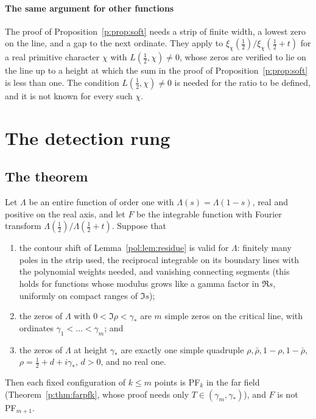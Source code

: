 \paragraph{The same argument for other functions} The proof of Proposition~\ref{p:prop:soft} needs a strip of finite width, a lowest zero on the line, and a gap to the next ordinate. They apply to $\xi_\chi(\frac12)/\xi_\chi(\frac12+t)$ for a real primitive character $\chi$ with $L(\frac12,\chi)\ne0$, whose zeros are verified to lie on the line up to a height at which the sum in the proof of Proposition~\ref{p:prop:soft} is less than one. The condition $L(\frac12,\chi)\ne0$ is needed for the ratio to be defined, and it is not known for every such $\chi$.

\section{The detection rung}\label{p:sec:detect}

\subsection{The theorem}

\begin{theorem}\label{p:thm:detect}
Let $\Lambda$ be an entire function of order one with $\Lambda(s)=\Lambda(1-s)$, real and positive on the real axis, and let $F$ be the integrable function with Fourier transform $\Lambda(\frac12)/\Lambda(\frac12+t)$. Suppose that
\begin{enumerate}
\item the contour shift of Lemma~\ref{pol:lem:residue} is valid for $\Lambda$: finitely many poles in the strip used, the reciprocal integrable on its boundary lines with the polynomial weights needed, and vanishing connecting segments (this holds for functions whose modulus grows like a gamma factor in $\Re s$, uniformly on compact ranges of $\Im s$);
\item the zeros of $\Lambda$ with $0<\Im\rho<\gamma_*$ are $m$ simple zeros on the critical line, with ordinates $\gamma_1<\dots<\gamma_m$; and
\item the zeros of $\Lambda$ at height $\gamma_*$ are exactly one simple quadruple $\rho,\bar\rho,1-\rho,1-\bar\rho$, $\rho=\frac12+d+i\gamma_*$, $d>0$, and no real one.
\end{enumerate}
Then each fixed configuration of $k\le m$ points is PF$_k$ in the far field (Theorem~\ref{p:thm:farpfk}, whose proof needs only $T\in(\gamma_m,\gamma_*)$), and $F$ is not PF$_{m+1}$.
\end{theorem}

